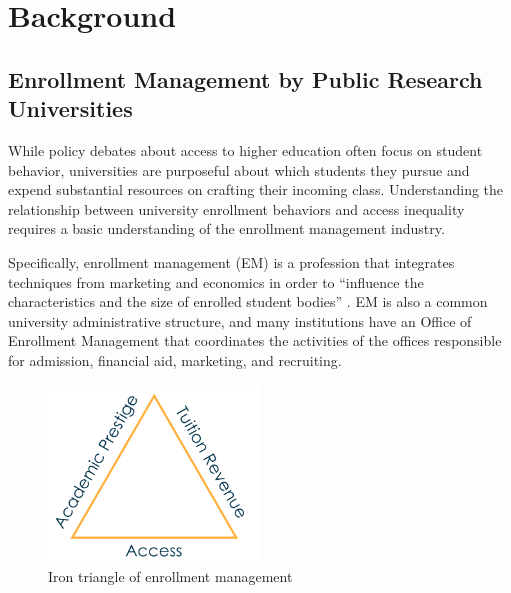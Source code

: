 \documentclass{article}
\begin{document}
\section*{Background}
\subsection*{Enrollment Management by Public Research Universities}

While policy debates about access to higher education often focus on student behavior, universities are purposeful about which students they pursue and expend substantial resources on crafting their incoming class. Understanding the relationship between university enrollment behaviors and access inequality requires a basic understanding of the enrollment management industry. 

Specifically, enrollment management (EM) is a profession that integrates techniques from marketing and economics in order to ``influence the characteristics and the size of enrolled student bodies'' \citep{RN2771}. EM is also a common university administrative structure, and many institutions have an Office of Enrollment Management that coordinates the activities of the offices responsible for admission, financial aid, marketing, and recruiting.

\begin{figure}[!t]
    \centering
    \includegraphics[width=0.5\textwidth]{assets/images/iron_triangle.png}
    \caption{Iron triangle of enrollment management}
    \label{fig:iron_triangle}
\end{figure}
\end{document}
